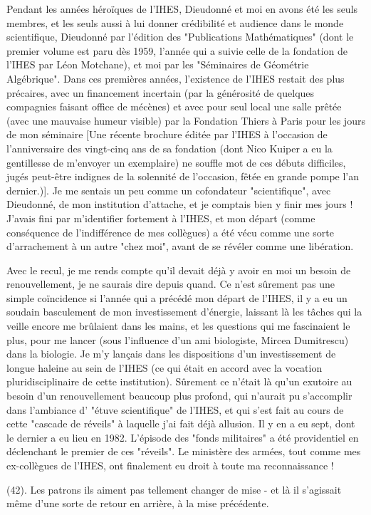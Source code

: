 {Pendant les années héroïques de l'IHES, Dieudonné et moi en avons été les seuls membres, et les seuls aussi à lui donner crédibilité et audience dans le monde scientifique, Dieudonné par l'édition des "Publications Mathématiques" (dont le premier volume est paru dès 1959, l'année qui a suivie celle de la fondation de l'IHES par Léon Motchane), et moi par les "Séminaires de Géométrie Algébrique". Dans ces premières années, l'existence de l'IHES restait des plus précaires, avec un financement incertain (par la générosité de quelques compagnies faisant office de mécènes) et avec pour seul local une salle prêtée (avec une mauvaise humeur visible) par la Fondation Thiers à Paris pour les jours de mon séminaire [Une récente brochure éditée par l'IHES à l'occasion de l'anniversaire des vingt-cinq ans de sa fondation (dont Nico Kuiper a eu la gentillesse de m'envoyer un exemplaire) ne souffle mot de ces débuts difficiles, jugés peut-être indignes de la solennité de l'occasion, fêtée en grande pompe l'an dernier.)]. Je me sentais un peu comme un cofondateur "scientifique", avec Dieudonné, de mon institution d'attache, et je comptais bien y finir mes jours ! J'avais fini par m'identifier fortement à l'IHES, et mon départ (comme conséquence de l'indifférence de mes collègues) a été vécu comme une sorte d'arrachement à un autre "chez moi", avant de se révéler comme une libération.

Avec le recul, je me rends compte qu'il devait déjà y avoir en moi un besoin de renouvellement, je ne saurais dire depuis quand. Ce n'est sûrement pas une simple coïncidence si l'année qui a précédé mon départ de l'IHES, il y a eu un soudain basculement de mon investissement d'énergie, laissant là les tâches qui la veille encore me brûlaient dans les mains, et les questions qui me fascinaient le plus, pour me lancer (sous l'influence d'un ami biologiste, Mircea Dumitrescu) dans la biologie. Je m'y lançais dans les dispositions d'un investissement de longue haleine au sein de l'IHES (ce qui était en accord avec la vocation pluridisciplinaire de cette institution). Sûrement ce n'était là qu'un exutoire au besoin d'un renouvellement beaucoup plus profond, qui n'aurait pu s'accomplir dans l'ambiance d' "étuve scientifique" de l'IHES, et qui s'est fait au cours de cette "cascade de réveils" à laquelle j'ai fait déjà allusion. Il y en a eu sept, dont le dernier a eu lieu en 1982. L'épisode des "fonds militaires" a été providentiel en déclenchant le premier de ces "réveils". Le ministère des armées, tout comme mes ex-collègues de l'IHES, ont finalement eu droit à toute ma reconnaissance !}(42). Les patrons ils aiment pas tellement changer de mise - et là il s'agissait même d'une sorte de retour en arrière, à la mise précédente.

